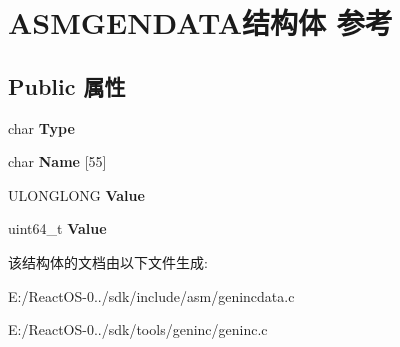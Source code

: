 \hypertarget{struct_a_s_m_g_e_n_d_a_t_a}{}\section{A\+S\+M\+G\+E\+N\+D\+A\+T\+A结构体 参考}
\label{struct_a_s_m_g_e_n_d_a_t_a}
\subsection*{Public 属性}
\begin{DoxyCompactItemize}
\item 
\mbox{\label{struct_a_s_m_g_e_n_d_a_t_a_a6b55d7df633b86eb4453c890da39b781}} 
char {\bfseries Type}
\item 
\mbox{\label{struct_a_s_m_g_e_n_d_a_t_a_a1f105b3e5ef4eb07299876b59ddccd42}} 
char {\bfseries Name} \mbox{[}55\mbox{]}
\item 
\mbox{\label{struct_a_s_m_g_e_n_d_a_t_a_a78f7a0763b4d426f79096bccb0204d60}} 
U\+L\+O\+N\+G\+L\+O\+NG {\bfseries Value}
\item 
\mbox{\label{struct_a_s_m_g_e_n_d_a_t_a_a164c4e3ceb2385edfafa7d0a1523ccb6}} 
uint64\+\_\+t {\bfseries Value}
\end{DoxyCompactItemize}


该结构体的文档由以下文件生成\+:\begin{DoxyCompactItemize}
\item 
E\+:/\+React\+O\+S-\/0../sdk/include/asm/genincdata.\+c\item 
E\+:/\+React\+O\+S-\/0../sdk/tools/geninc/geninc.\+c\end{DoxyCompactItemize}
